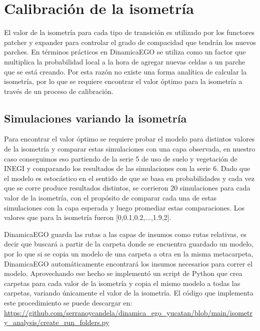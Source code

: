 \documentclass[12pt,a4paper,oldfontcommands]{article}
\begin{document}
\section{Calibración de la isometría}
El valor de la isometría para cada tipo de transición es utilizado por los functores patcher y expander para controlar el grado de compacidad que tendrán los nuevos parches. En términos prácticos en DinamicaEGO se utiliza como un factor que multiplica la probabilidad local a la hora de agregar nuevas celdas a un parche que se está creando. Por esta razón no existe una forma analítica de calcular la isometría, por lo que se requiere encontrar el valor óptimo para la isometría a través de un proceso de calibración. 
\subsection{Simulaciones variando la isometría}
Para encontrar el valor óptimo se requiere probar el modelo para distintos valores de la isometría y comparar estas simulaciones con una capa observada, en nuestro caso conseguimos eso partiendo de la serie 5 de uso de suelo y vegetación de INEGI y comparando los resultados de las simulaciones con la serie 6. Dado que el modelo es estocástico en el sentido de que se basa en probabilidades y cada vez que se corre produce resultados distintos, se corrieron 20 simulaciones para cada valor de la isometría, con el propósito de comparar cada una de estas simulaciones con la capa esperada y luego promediar estas comparaciones. Los valores que para la isometría fueron [0,0.1,0.2,...,1.9,2].

DinamicaEGO guarda las rutas a las capas de insumos como rutas relativas, es decir que buscará a partir de la carpeta donde se encuentra guardado un modelo, por lo que si se copia un modelo de una carpeta a otra en la misma metacarpeta, DinamicaEGO automáticamente encontrará los insumos necesarios para correr el modelo. Aprovechando ese hecho se implementó un script de Python que crea carpetas para cada valor de la isometría y copia el mismo modelo a todas las carpetas, variando únicamente el valor de la isometría. El código que implementa este procedimiento se puede descargar en: \url{https://github.com/serranoycandela/dinamica_ego_yucatan/blob/main/isometry_analysis/create_run_folders.py}
\end{document}
